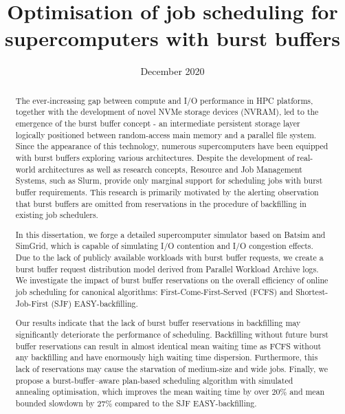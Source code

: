 \documentclass[en]{pracamgr}
\title{Optimisation of job scheduling for supercomputers with burst buffers}
\date{December 2020}
\begin{document}
\maketitle

\begin{abstract}
The ever-increasing gap between compute and I/O performance in HPC platforms, together with the development of novel NVMe storage devices (NVRAM), led to the emergence of the burst buffer concept - an intermediate persistent storage layer logically positioned between random-access main memory and a parallel file system. Since the appearance of this technology, numerous supercomputers have been equipped with burst buffers exploring various architectures. Despite the development of real-world architectures as well as research concepts, Resource and Job Management Systems, such as Slurm, provide only marginal support for scheduling jobs with burst buffer requirements. This research is primarily motivated by the alerting observation that burst buffers are omitted from reservations in the procedure of backfilling in existing job schedulers.

\medskip

In this dissertation, we forge a detailed supercomputer simulator based on Batsim and SimGrid, which is capable of simulating I/O contention and I/O congestion effects. Due to the lack of publicly available workloads with burst buffer requests, we create a burst buffer request distribution model derived from Parallel Workload Archive logs. We investigate the impact of burst buffer reservations on the overall efficiency of online job scheduling for canonical algorithms: First-Come-First-Served (FCFS) and Shortest-Job-First (SJF) EASY-backfilling.

\medskip

Our results indicate that the lack of burst buffer reservations in backfilling may significantly deteriorate the performance of scheduling. Backfilling without future burst buffer reservations can result in almost identical mean waiting time as FCFS without any backfilling and have enormously high waiting time dispersion. Furthermore, this lack of reservations may cause the starvation of medium-size and wide jobs. Finally, we propose a burst-buffer--aware plan-based scheduling algorithm with simulated annealing optimisation, which improves the mean waiting time by over $20\%$ and mean bounded slowdown by $27\%$ compared to the SJF EASY-backfilling.
\end{abstract}
\end{document}
